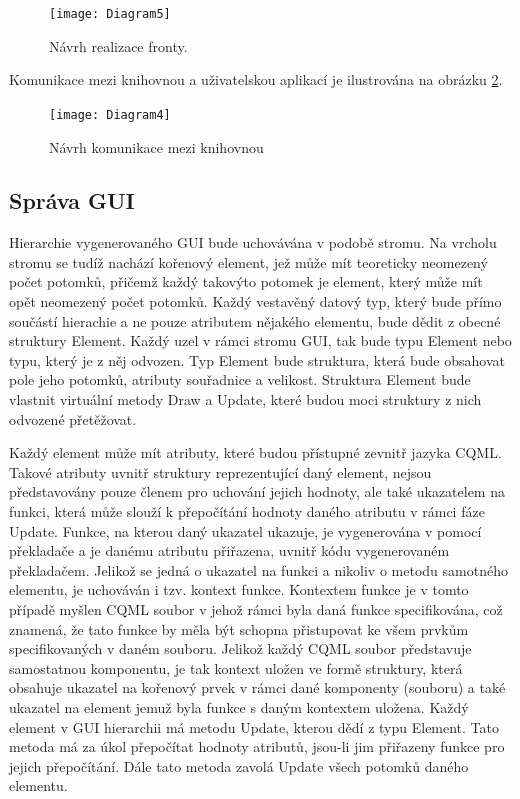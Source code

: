 \documentclass[report,11pt]{elsarticle}
\begin{document}
\begin{figure}[!ht]
\begin{center}
  \texttt{[image: Diagram5]}
\caption{{\label{fig:que1N}}Návrh realizace fronty.}
\end{center}
\end{figure}

Komunikace mezi knihovnou a uživatelskou aplikací je ilustrována na obrázku \ref{fig:lib1N}.\\


\begin{figure}[!ht]
\begin{center}
  \texttt{[image: Diagram4]}
\caption{{\label{fig:lib1N}} Návrh komunikace mezi knihovnou }
\end{center}
\end{figure}

\subsection {Správa GUI}
Hierarchie vygenerovaného GUI bude uchovávána v podobě stromu. Na vrcholu stromu se tudíž nachází kořenový element, jež může mít teoreticky neomezený počet potomků, přičemž každý takovýto potomek je element, který může mít opět neomezený počet potomků. Každý vestavěný datový typ, který bude přímo součástí hierachie a ne pouze atributem nějakého elementu, bude dědit z obecné struktury Element. Každý uzel v rámci stromu GUI, tak bude typu Element nebo typu, který je z něj odvozen. Typ Element bude struktura, která bude obsahovat pole jeho potomků, atributy souřadnice a velikost. Struktura Element bude vlastnit virtuální metody Draw a Update, které budou moci struktury z nich odvozené přetěžovat.

Každý element může mít atributy, které budou přístupné zevnitř jazyka CQML. Takové atributy uvnitř struktury reprezentující daný element, nejsou představovány pouze členem pro uchování jejich hodnoty, ale také ukazatelem na funkci, která může slouží k přepočítání hodnoty daného atributu v rámci fáze Update. Funkce, na kterou daný ukazatel ukazuje, je vygenerována v pomocí překladače a je danému atributu přiřazena, uvnitř kódu vygenerovaném překladačem. Jelikož se jedná o ukazatel na funkci a nikoliv o metodu samotného elementu, je uchováván i tzv. kontext funkce. Kontextem funkce je v tomto případě myšlen CQML soubor v jehož rámci byla daná funkce specifikována, což znamená, že tato funkce by měla být schopna přistupovat ke všem prvkům specifikovaných v daném souboru. Jelikož každý CQML soubor představuje samostatnou komponentu, je tak kontext uložen ve formě struktury, která obsahuje ukazatel na kořenový prvek v rámci dané komponenty (souboru) a také ukazatel na element jemuž byla funkce s daným kontextem uložena.
Každý element v GUI hierarchii má metodu Update, kterou dědí z typu Element. Tato metoda má za úkol přepočítat hodnoty atributů, jsou-li jim přiřazeny funkce pro jejich přepočítání. Dále tato metoda zavolá Update všech potomků daného elementu.
\end{document}
